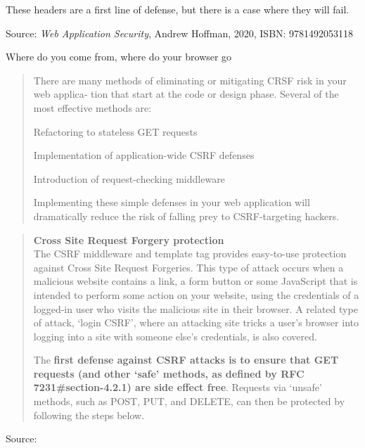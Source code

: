 \documentclass[Screen16to9,17pt]{foils}
\begin{document}
These headers are a first line of defense, but there is a case where they will fail.


Source: \emph{Web Application Security}, Andrew Hoffman, 2020, ISBN: 9781492053118

\begin{list2}
\item Where do you come from, where do your browser go
\end{list2}



\begin{quote}
There are many methods of eliminating or mitigating CRSF risk in your web applica‐
tion that start at the code or design phase.
Several of the most effective methods are:
\begin{list2}
\item Refactoring to stateless GET requests
\item Implementation of application-wide CSRF defenses
\item Introduction of request-checking middleware
\end{list2}
Implementing these simple defenses in your web application will dramatically reduce
the risk of falling prey to CSRF-targeting hackers.
\end{quote}





\begin{quote}{\bf
Cross Site Request Forgery protection}\\
The CSRF middleware and template tag provides easy-to-use protection against Cross Site Request Forgeries. This type of attack occurs when a malicious website contains a link, a form button or some JavaScript that is intended to perform some action on your website, using the credentials of a logged-in user who visits the malicious site in their browser. A related type of attack, ‘login CSRF’, where an attacking site tricks a user’s browser into logging into a site with someone else’s credentials, is also covered.

The {\bf first defense against CSRF attacks is to ensure that GET requests (and other ‘safe’ methods, as defined by RFC 7231\#section-4.2.1) are side effect free}. Requests via ‘unsafe’ methods, such as POST, PUT, and DELETE, can then be protected by following the steps below.
\end{quote}
Source: 
\end{document}

